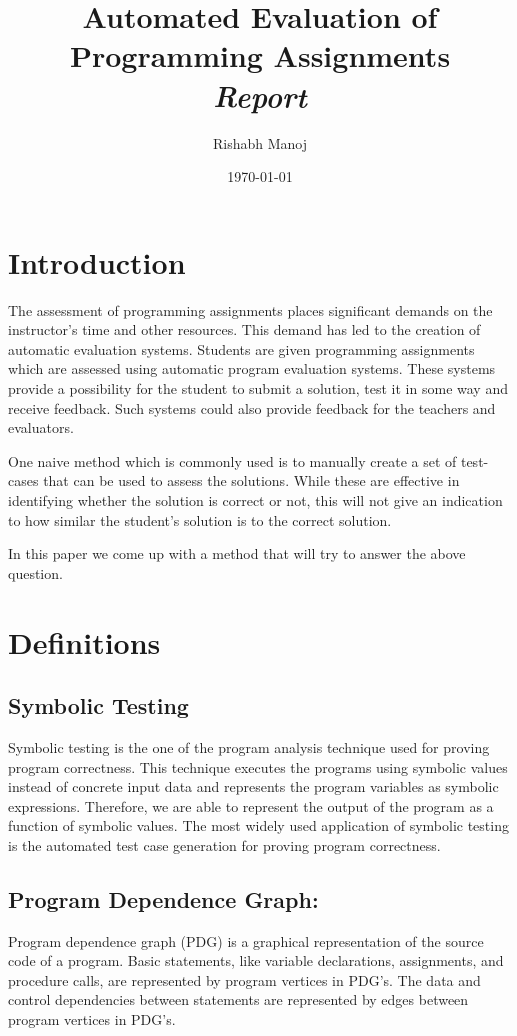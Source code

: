 \documentclass{article}
\title{Automated Evaluation of Programming Assignments \\ \vspace{0.5mm} \large\textit{Report}}
\author{Rishabh Manoj}
\date{\today}
\begin{document}
\maketitle
\section{Introduction}

The assessment of programming assignments places significant demands on the instructor’s time and other resources. This demand has led to the creation of automatic evaluation systems. Students are given programming assignments which are assessed using automatic program evaluation systems. These systems provide a possibility for the student to submit a solution, test it in some way and receive feedback. Such systems could also provide feedback for the teachers and evaluators.

One naive method which is commonly used is to manually create a set of test-cases that can be used to assess the solutions. While these are effective in identifying whether the solution is correct or not, this will not give an indication to how similar the student's solution is to the correct solution.

In this paper we come up with a method that will try to answer the above question.

\section{Definitions}

\subsection*{Symbolic Testing}
Symbolic testing is the one of the program analysis technique used for proving program correctness. This technique executes the programs using symbolic values instead of concrete input data and represents the program variables as symbolic expressions. Therefore, we are able to represent the output of the program as a function of symbolic values. The most widely used application of symbolic testing is the automated test case generation for proving program correctness.

\subsection*{Program Dependence Graph:} Program dependence graph (PDG) is a graphical representation of the source code of a program. Basic statements, like variable declarations, assignments, and procedure calls, are represented by program vertices in PDG’s. The data and control
dependencies between statements are represented by edges between program vertices
in PDG’s.\\
\end{document}

